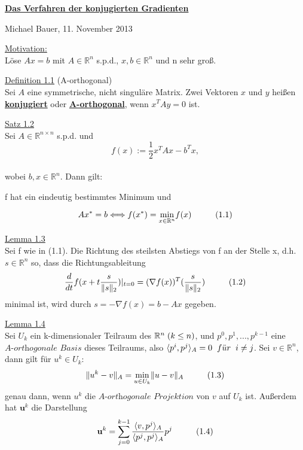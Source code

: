 \documentclass[a4paper]{letter}
\begin{document}
\begin{center}
	\underline{
		\textbf{
			\large{
				Das Verfahren der konjugierten Gradienten
			}
		}
	}
\end{center}

\begin{center}
Michael Bauer, 11. November 2013
\end{center}

\parskip 5pt

\underline{Motivation:}
\\L\"ose $Ax = b$ mit $A\in\mathbb{R}^{n}$ s.p.d., $x, b\in\mathbb{R}^{n}$ und n sehr gro{\ss}.

\parskip 12pt

\underline{Definition 1.1} (A-orthogonal)
\\Sei $A$ eine symmetrische, nicht singul\"are Matrix. Zwei Vektoren $x$ und $y$ hei{\ss}en \underline{\textbf{konjugiert}} oder \underline{\textbf{A-orthogonal}},
wenn $x^{T}Ay = 0$ ist.

\underline{Satz 1.2}
\\Sei $A\in\mathbb{R}^{n \times n}$ s.p.d. und
$$f(x) := \frac 1 2 x^{T}Ax - b^{T}x,$$
\\wobei $b,x \in \mathbb{R}^{n}$. Dann gilt:
\begin{center}
f hat ein eindeutig bestimmtes Minimum und
\end{center}
$$Ax^{*} = b \Longleftrightarrow f(x^{*}) = \underset{x\in\mathbb{R}^{n}}{\min} f(x) \hspace{10mm}(1.1)$$

\underline{Lemma 1.3}
\\Sei f wie in (1.1). Die Richtung des steilsten Abstiegs von f an der Stelle x, d.h. $s\in\mathbb{R}^{n}$ so, dass die Richtungsableitung
$$\frac d {dt} f(x+t\frac s {\|s\|_{2}})|_{t=0} = (\nabla f(x))^{T} (\frac s {\|s\|_{2}}) \hspace{10mm}(1.2)$$
minimal ist, wird durch $s = -\nabla f(x) = b - Ax$ gegeben.

\underline{Lemma 1.4}
\\Sei $U_{k}$ ein k-dimensionaler Teilraum des $\mathbb{R}^{n} \hspace{1mm} (k \le n)$, und $p^{0}, p^{1},...,p^{k-1}$ eine $\textit{A-orthogonale Basis}$ dieses Teilraums, also $\langle p^{i}, p^{j} \rangle _{A} = 0 \hspace{2mm} f\ddot{u}r \hspace{2mm} i \ne j$. Sei $v \in \mathbb{R}^{n}$, dann gilt f\"ur $u^{k} \in U_{k}$:
$$\|u^{k} - v\|_{A} = \underset{u \in U_{k}}{\min} \|u - v\|_{A} \hspace{10mm}(1.3)$$
genau dann, wenn $u^{k}$ die $\textit{A-orthogonale Projektion}$ von $v$ auf $U_{k}$ ist. Au{\ss}erdem hat $\textbf{u}^{k}$ die Darstellung
$$\textbf{u}^{k} = \sum_{j=0}^{k-1} \frac {\langle v, p^{j} \rangle _{A}} {\langle p^{j}, p^{j} \rangle _{A}} p^{j} \hspace{10mm}(1.4)$$
\end{document}
